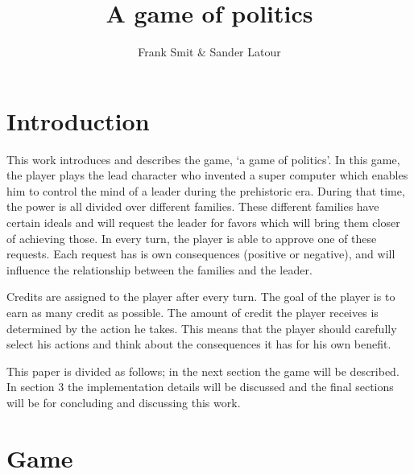 \documentclass[11pt,a4paper]{article}
\author{Frank Smit \& Sander Latour}
\title{A game of politics}
\begin{document}
\maketitle

\section{Introduction}
This work introduces and describes the game, `a game of politics'. In this game, the player plays the lead character who invented a super computer which enables him to control the mind of a leader during the prehistoric era. During that time, the power is all divided over different families. These different families have certain ideals and will request the leader for favors which will bring them closer of achieving those. In every turn, the player is able to approve one of these requests. Each request has is own consequences (positive or negative), and will influence the relationship between the families and the leader. 

Credits are assigned to the player after every turn. The goal of the player is to earn as many credit as possible. The amount of credit the player receives is determined by the action he takes. This means that the player should carefully select his actions and think about the consequences it has for his own benefit. 

This paper is divided as follows; in the next section the game will be described. In section 3 the implementation details will be discussed and the final sections will be for concluding and discussing this work.

\section{Game}
\end{document}
